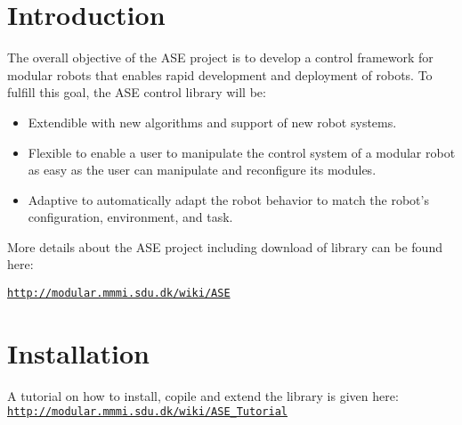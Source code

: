 \hypertarget{main_intro_sec}{}\section{Introduction}\label{main_intro_sec}
The overall objective of the ASE project is to develop a control framework for modular robots that enables rapid development and deployment of robots. To fulfill this goal, the ASE control library will be:\begin{itemize}
\item Extendible with new algorithms and support of new robot systems.\item Flexible to enable a user to manipulate the control system of a modular robot as easy as the user can manipulate and reconfigure its modules.\item Adaptive to automatically adapt the robot behavior to match the robot's configuration, environment, and task.\end{itemize}


More details about the ASE project including download of library can be found here:

\href{http://modular.mmmi.sdu.dk/wiki/ASE}{\tt http://modular.mmmi.sdu.dk/wiki/ASE}\hypertarget{main_install_sec}{}\section{Installation}\label{main_install_sec}
A tutorial on how to install, copile and extend the library is given here: \href{http://modular.mmmi.sdu.dk/wiki/ASE_Tutorial}{\tt http://modular.mmmi.sdu.dk/wiki/ASE\_\-Tutorial} 